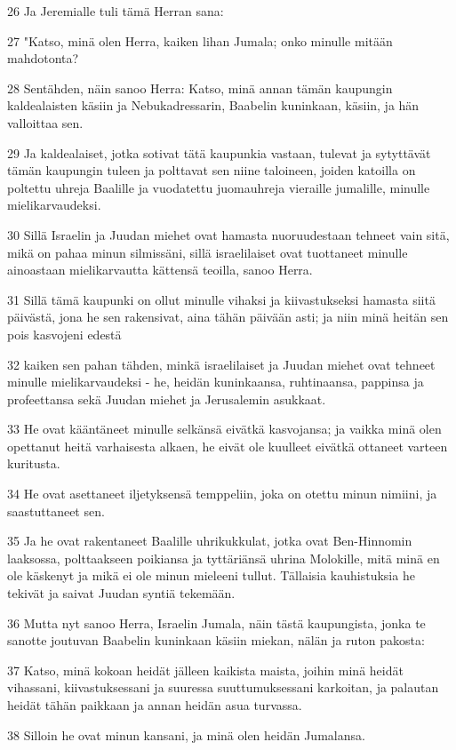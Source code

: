 \par 26 Ja Jeremialle tuli tämä Herran sana:
\par 27 "Katso, minä olen Herra, kaiken lihan Jumala; onko minulle mitään mahdotonta?
\par 28 Sentähden, näin sanoo Herra: Katso, minä annan tämän kaupungin kaldealaisten käsiin ja Nebukadressarin, Baabelin kuninkaan, käsiin, ja hän valloittaa sen.
\par 29 Ja kaldealaiset, jotka sotivat tätä kaupunkia vastaan, tulevat ja sytyttävät tämän kaupungin tuleen ja polttavat sen niine taloineen, joiden katoilla on poltettu uhreja Baalille ja vuodatettu juomauhreja vieraille jumalille, minulle mielikarvaudeksi.
\par 30 Sillä Israelin ja Juudan miehet ovat hamasta nuoruudestaan tehneet vain sitä, mikä on pahaa minun silmissäni, sillä israelilaiset ovat tuottaneet minulle ainoastaan mielikarvautta kättensä teoilla, sanoo Herra.
\par 31 Sillä tämä kaupunki on ollut minulle vihaksi ja kiivastukseksi hamasta siitä päivästä, jona he sen rakensivat, aina tähän päivään asti; ja niin minä heitän sen pois kasvojeni edestä
\par 32 kaiken sen pahan tähden, minkä israelilaiset ja Juudan miehet ovat tehneet minulle mielikarvaudeksi - he, heidän kuninkaansa, ruhtinaansa, pappinsa ja profeettansa sekä Juudan miehet ja Jerusalemin asukkaat.
\par 33 He ovat kääntäneet minulle selkänsä eivätkä kasvojansa; ja vaikka minä olen opettanut heitä varhaisesta alkaen, he eivät ole kuulleet eivätkä ottaneet varteen kuritusta.
\par 34 He ovat asettaneet iljetyksensä temppeliin, joka on otettu minun nimiini, ja saastuttaneet sen.
\par 35 Ja he ovat rakentaneet Baalille uhrikukkulat, jotka ovat Ben-Hinnomin laaksossa, polttaakseen poikiansa ja tyttäriänsä uhrina Molokille, mitä minä en ole käskenyt ja mikä ei ole minun mieleeni tullut. Tällaisia kauhistuksia he tekivät ja saivat Juudan syntiä tekemään.
\par 36 Mutta nyt sanoo Herra, Israelin Jumala, näin tästä kaupungista, jonka te sanotte joutuvan Baabelin kuninkaan käsiin miekan, nälän ja ruton pakosta:
\par 37 Katso, minä kokoan heidät jälleen kaikista maista, joihin minä heidät vihassani, kiivastuksessani ja suuressa suuttumuksessani karkoitan, ja palautan heidät tähän paikkaan ja annan heidän asua turvassa.
\par 38 Silloin he ovat minun kansani, ja minä olen heidän Jumalansa.
